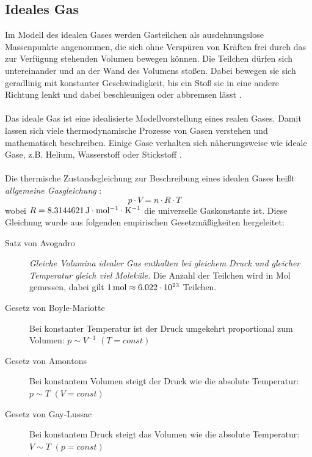 \documentclass[a4paper,titlepage]{scrartcl}
\numberwithin{equation}{section}
\begin{document}
\subsection{Ideales Gas}
Im Modell des idealen Gases werden Gasteilchen als ausdehnungslose Massenpunkte angenommen, die sich ohne Verspüren von Kräften frei durch das zur Verfügung stehenden Volumen bewegen können. Die Teilchen dürfen sich untereinander und an der Wand des Volumens stoßen. Dabei bewegen sie sich geradlinig mit konstanter Geschwindigkeit, bis ein Stoß sie in eine andere Richtung lenkt und dabei beschleunigen oder abbremsen lässt \cite{wiki:idealesGas}.\\ \\
Das ideale Gas ist eine idealisierte Modellvorstellung eines realen Gases. Damit lassen sich viele thermodynamische Prozesse von Gasen verstehen und mathematisch beschreiben. Einige Gase verhalten sich näherungsweise wie ideale Gase, z.B. Helium, Wasserstoff oder Stickstoff \cite{wiki:idealesGas}.\\ \\
Die thermische Zustandsgleichung zur Beschreibung eines idealen Gases heißt \emph{allgemeine Gasgleichung} \cite{wiki:idealesGas}:
\begin{equation*}
p \cdot V = n \cdot R \cdot T \quad
\end{equation*}
wobei $R=\unit[8.3144621]{J \cdot mol^{-1} \cdot K^{-1}}$ die universelle Gaskonstante ist. Diese Gleichung wurde aus folgenden empirischen Gesetzmäßigkeiten hergeleitet:
\begin{description}
\item[Satz von Avogadro] \emph{Gleiche Volumina idealer Gas enthalten bei gleichem Druck und gleicher Temperatur gleich viel Moleküle.} Die Anzahl der Teilchen wird in Mol gemessen, dabei gilt $\unit[1]{mol} \approx 6.022 \cdot 10^{23}$ Teilchen.
\item[Gesetz von Boyle-Mariotte] Bei konstanter Temperatur ist der Druck umgekehrt proportional zum Volumen: $p \sim V^{-1}$ $(T=const)$
\item[Gesetz von Amontons] Bei konstantem Volumen steigt der Druck wie die absolute Temperatur: $p \sim T$ $(V=const)$
\item[Gesetz von Gay-Lussac] Bei konstantem Druck steigt das Volumen wie die absolute Temperatur: $V \sim T$ $(p=const)$
\end{description}
\end{document}
